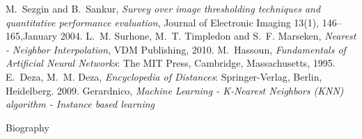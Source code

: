 \documentclass[journal,twoside]{IEEEtran}
\begin{document}
\begin{thebibliography}{1}
\bibitem{}
M.~Sezgin and B.~Sankur, \emph{Survey over image thresholding techniques and quantitative performance evaluation}, Journal of Electronic Imaging 13(1), 146–165,January 2004.
\bibitem{}
L.~M. Surhone, M.~T. Timpledon and S.~F. Marseken, \emph{Nearest - Neighbor Interpolation}, VDM Publishing, 2010.
\bibitem{}
M.~Hassoun, \emph{Fundamentals of Artificial Neural Networks}: The MIT Press, Cambridge, Massachusetts, 1995.
\bibitem{} 
E.~Deza, M.~M. Deza, \emph{Encyclopedia of Distances}: Springer-Verlag, Berlin, Heidelberg. 2009.
\bibitem{}
Gerardnico, \emph{Machine Learning - K-Nearest Neighbors (KNN) algorithm - Instance based learning}    
\end{thebibliography}

\newpage
Biography

% 








\end{document}
